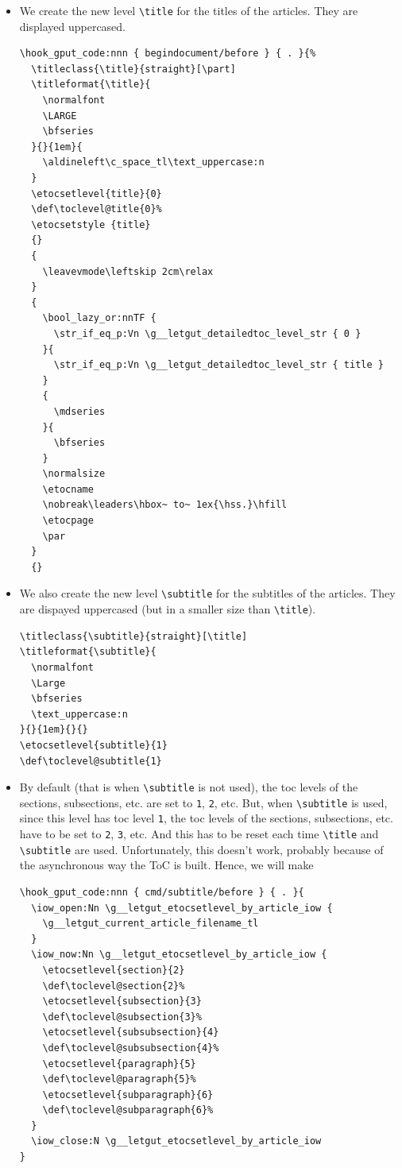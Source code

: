 \documentclass{letgut}
\begin{document}
\begin{itemize}
\item We create the new level \lstinline+\title+ for the titles of the articles. They are
displayed uppercased.

\begin{lstlisting}
\hook_gput_code:nnn { begindocument/before } { . }{%
  \titleclass{\title}{straight}[\part]
  \titleformat{\title}{
    \normalfont
    \LARGE
    \bfseries
  }{}{1em}{
    \aldineleft\c_space_tl\text_uppercase:n
  }
  \etocsetlevel{title}{0}
  \def\toclevel@title{0}%
  \etocsetstyle {title}
  {}
  {
    \leavevmode\leftskip 2cm\relax
  }
  {
    \bool_lazy_or:nnTF {
      \str_if_eq_p:Vn \g__letgut_detailedtoc_level_str { 0 }
    }{
      \str_if_eq_p:Vn \g__letgut_detailedtoc_level_str { title }
    }
    {
      \mdseries
    }{
      \bfseries
    }
    \normalsize
    \etocname
    \nobreak\leaders\hbox~ to~ 1ex{\hss.}\hfill
    \etocpage
    \par
  }
  {}
\end{lstlisting}
\item We also create the new level \lstinline+\subtitle+ for the subtitles of the
articles. They are dispayed uppercased (but in a smaller size than \lstinline+\title+).
\begin{lstlisting}
\titleclass{\subtitle}{straight}[\title]
\titleformat{\subtitle}{
  \normalfont
  \Large
  \bfseries
  \text_uppercase:n
}{}{1em}{}{}
\etocsetlevel{subtitle}{1}
\def\toclevel@subtitle{1}
\end{lstlisting}
\item By default (that is when \lstinline+\subtitle+ is not used), the toc levels of the
sections, subsections, etc. are set to \lstinline+1+, \lstinline+2+, etc. But, when \lstinline+\subtitle+ is
used, since this level has toc level \lstinline+1+, the toc levels of the sections,
subsections, etc. have to be set to \lstinline+2+, \lstinline+3+, etc. And this has to be reset
each time \lstinline+\title+ and  \lstinline+\subtitle+ are used. Unfortunately, this doesn't
work, probably because of the asynchronous way the ToC is built. Hence, we
will make
\begin{lstlisting}
\hook_gput_code:nnn { cmd/subtitle/before } { . }{
  \iow_open:Nn \g__letgut_etocsetlevel_by_article_iow {
    \g__letgut_current_article_filename_tl
  }
  \iow_now:Nn \g__letgut_etocsetlevel_by_article_iow {
    \etocsetlevel{section}{2}
    \def\toclevel@section{2}%
    \etocsetlevel{subsection}{3}
    \def\toclevel@subsection{3}%
    \etocsetlevel{subsubsection}{4}
    \def\toclevel@subsubsection{4}%
    \etocsetlevel{paragraph}{5}
    \def\toclevel@paragraph{5}%
    \etocsetlevel{subparagraph}{6}
    \def\toclevel@subparagraph{6}%
  }
  \iow_close:N \g__letgut_etocsetlevel_by_article_iow
}
\end{lstlisting}


\end{itemize}
\end{document}
